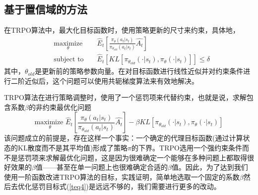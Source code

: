 \documentclass[bachelor]{thesis-uestc}
\begin{document}
	\subsection{基于置信域的方法}
	在TRPO算法中，最大化目标函数时，使用策略更新的尺寸来约束，具体地，
	\begin{equation*}
	\label{teq3}
	\begin{aligned}
		& \underset{\theta}{\text{maximize}}& & \hat{E}_t[\frac{\pi_\theta(a_t|s_t)}{\pi_{\theta_{old}}(a_t|s_t)}\hat{A_t}]\\
		& \text{subject to }& &\hat{E}_t[KL[\pi_{\theta_{old}}(\cdot|s_t),\pi_\theta(\cdot|s_t)]]\leq \delta
	\end{aligned}
	\end{equation*}
	其中，$\theta_{old}$是更新前的策略参数向量。在对目标函数进行线性近似并对约束条件进行二阶近似后，这个问题可以使用共轭梯度算法来有效地解决。
	
	TRPO算法在进行策略调整时，使用了一个惩罚项来代替约束，也就是说，求解包含系数$\beta$的非约束最优化问题
	\begin{equation}
		\label{teq4}
		\underset{\theta}{\text{maximize }} \hat{E}_t[\frac{\pi_\theta(a_t|s_t)}{\pi_{\theta_{old}}(a_t|s_t)}\hat{A_t}]-\beta KL[\pi_{\theta_{old}}(\cdot|s_t),\pi_\theta(\cdot|s_t)]
	\end{equation}
	该问题成立的前提是，存在这样一个事实：一个确定的代理目标函数(通过计算状态的KL散度而不是其平均值)形成了策略$\pi$的下界。TRPO选用一个强约束条件而不是惩罚项来求解最优化问题，这是因为很难确定一个能够在多种问题上都取得很好效果的$\beta$值——甚至在单一问题上也很难确定合适的$\beta$值。因此，为了达到我们使用一阶函数改进TRPO算法的目标，实践证明，简单地选取一个固定的系数$\beta$然后去优化惩罚目标式(\ref{teq4})是远远不够的，我们需要进行更多的改动。
\end{document}
